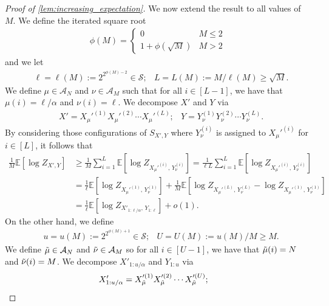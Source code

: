 \documentclass[11pt]{amsart}
\numberwithin{equation}{section}
\numberwithin{equation}{section}
\newcommand{\1}{\mathbbm{1}}
\newcommand{\E}{\mathbb{E}}
\theoremstyle{definition}
\begin{document}
\begin{proof}[Proof of \cref{lem:increasing_expectation}]
    We now extend the result to all values of $M$. We define the iterated square root
    \begin{align*}
        \phi(M) = \begin{cases}
        0 & M \leq 2 \\
        1 + \phi(\sqrt{M}) & M > 2
    \end{cases}
    \end{align*}
    and we let 
    \begin{align*}
        & \ell = \ell(M) := 2^{2^{\phi(M)-2}} \in \mathcal S;
        & L = L(M) := M/\ell(M) \geq \sqrt{M}.
    \end{align*}
    We define $\mu \in \mathcal A_{N}$ and $\nu \in \mathcal A_M$ such that for all $i \in [L-1]$, we have that $\mu(i) = \ell/\alpha$ and $\nu(i) = \ell$. We decompose $X'$ and $Y$ via
    \begin{align*}
        & X' = X_\mu'^{(1)}X_\mu'^{(2)}\cdots X_\mu'^{(L)};
        & Y = Y_{\nu}^{(1)}Y_{\nu}^{(2)}\cdots Y_{\nu}^{(L)}.
    \end{align*}
    By considering those configurations of $S_{X',Y}$ where $Y_{\nu}^{(i)}$ is assigned to $X_{\mu}'^{(i)}$ for $i \in [L]$, it follows that
    \begin{align}
        \frac{1}{M} \E\left[ \log Z_{X',Y} \right] & \geq \frac{1}{M}\sum_{i=1}^L \E\left[ \log Z_{X_\mu'^{(i)},\, Y_{\nu}^{(i)}} \right] = \frac{1}{\ell L} \sum_{i=1}^L \E\left[ \log Z_{X_\mu'^{(i)},\, Y_{\nu}^{(i)}} \right] \nonumber \\
        & = \frac{1}{\ell} \E\left[ \log Z_{X_\mu'^{(1)},\, Y_{\nu}^{(1)}} \right] + \frac{1}{M} \E\left[\log Z_{X_\mu'^{(L)},\, Y_{\nu}^{(L)}} - \log Z_{X_{\mu}'^{(1)},\, Y_{\nu}^{(1)}} \right] \nonumber \\
        & = \frac{1}{\ell}\E\left[ \log Z_{X'_{1:\ell/\alpha},\,Y_{1:\ell}} \right] + o(1). \label{eq:interpolation_lower_bound}
    \end{align}
    On the other hand, we define 
    \begin{align*}
        & u = u(M) := 2^{2^{\phi(M)+1}} \in \mathcal S;
        & U = U(M) := u(M)/M \geq M.
    \end{align*}
    We define $\Tilde{\mu} \in \mathcal A_{N}$ and $\Tilde{\nu} \in \mathcal A_M$ so for all $i \in [U-1]$, we have that $\Tilde{\mu}(i) = N$ and $\Tilde{\nu}(i) = M$. We decompose $X'_{1:u/\alpha}$ and $Y_{1:u}$ via
    \begin{align*}
        & X'_{1:u/\alpha} = X_{\Tilde{\mu}}'^{(1)}X_{\Tilde{\mu}}'^{(2)}\cdots X_{\Tilde{\mu}}'^{(U)};

\end{align*}
\end{proof}
\end{document}
